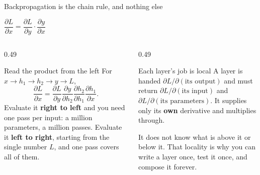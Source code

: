 \documentclass[aspectratio=169]{beamer}
\begin{document}
\begin{frame}[shrink=4]{Backpropagation is the chain rule, and nothing else}
  \begin{exampleblock}{}
    \centering\large
    $\dfrac{\partial L}{\partial x}
      = \dfrac{\partial L}{\partial y}\cdot\dfrac{\partial y}{\partial x}$
  \end{exampleblock}
  \begin{columns}[T]
    \begin{column}{0.49\textwidth}
      \begin{block}{Read the product from the left}
        For $x \to h_1 \to h_2 \to y \to L$,
        \[
          \frac{\partial L}{\partial x}
          = \frac{\partial L}{\partial y}
            \frac{\partial y}{\partial h_2}
            \frac{\partial h_2}{\partial h_1}
            \frac{\partial h_1}{\partial x}.
        \]
        Evaluate it \textbf{right to left} and you need one pass per input:
        a million parameters, a million passes. Evaluate it
        \textbf{left to right}, starting from the single number $L$, and one
        pass covers all of them.
      \end{block}
    \end{column}
    \begin{column}{0.49\textwidth}
      \begin{alertblock}{Each layer's job is local}
        A layer is handed $\partial L/\partial(\text{its output})$ and must
        return $\partial L/\partial(\text{its input})$ and
        $\partial L/\partial(\text{its parameters})$. It supplies only its
        \textbf{own} derivative and multiplies through.

        \medskip
        It does not know what is above it or below it. That locality is why
        you can write a layer once, test it once, and compose it forever.
      \end{alertblock}
    \end{column}
  \end{columns}
\end{frame}
\end{document}
